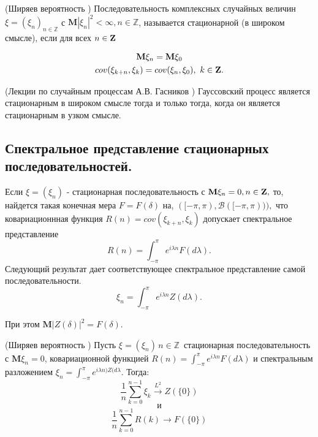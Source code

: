\begin{definition}(Ширяев вероятность \cite{ShiryaevVeroyatnost1})
Последовательность комплексных случайных величин $\xi = (\xi_n)_{n\in\mathbb{Z}}$ с $\mathbf{M}|\xi_n|^2 < \infty, n\in\mathbb{Z}$, называется стационарной (в широком смысле), если для всех $n \in \mathbb{\bf{Z}}$ 

\begin{equation}
\begin{gathered}
\mathbf{M}\xi_n = \mathbf{M}\xi_0 \\
cov(\xi_{k+n}, \xi_k) = cov(\xi_n, \xi_0), \  k\in\mathbb{\bf{Z}}.
\end{gathered}
\end{equation}

\end{definition}

\begin{theorem}(Лекции по случайным процессам А.В. Гасников \cite{GasnikovLectionsRP}) 
Гауссовский процесс является стационарным в широком смысле тогда и только тогда, когда он является стационарным в узком смысле.
\end{theorem}

\subsection{Спектральное представление стационарных последовательностей.}

Если $\xi = (\xi_n)$ - стационарная последовательность с $\mathbf{M}\xi_n = 0, n \in \mathbb{\bf{Z}},$ то, найдется такая конечная мера $F = F(\delta)$ на, $([-\pi, \pi), \mathscr{B}([-\pi, \pi))),$ что ковариационнная функция $R(n) = cov(\xi_{k+n}, \xi_k)$ допускает спектральное представление
\begin{equation}
R(n) = \int_{-\pi}^{\pi} e^{i\lambda n}F(d\lambda).
\end{equation}
Следующий результат дает соответствующее спектральное представление самой последовательности.
\begin{equation}\label{spkt}
\xi_n = \int_{-\pi}^{\pi} e^{i\lambda n}Z(d\lambda).
\end{equation}

При этом $\mathbf{M}|Z(\delta)|^2 = F(\delta)$.

\begin{theorem}\label{t1}(Ширяев вероятность \cite{ShiryaevVeroyatnost1})
Пусть $\xi = (\xi_n)\, n \in \mathbb{Z}\,$ стационарная последовательность с $\mathbf{M}\xi_n = 0$, ковариационной функцией $R(n) = \int_{-\pi}^{\pi}   e^{i\lambda n}F(d\lambda)$ и спектральным разложением $\xi_n = \int_{-\pi}^{\pi} e^{i\lambda n)Z(d\lambda}$. Тогда:
\begin{equation}\label{eq1}
\frac{1}{n}\sum_{k=0}^{n-1}\xi_k \xrightarrow{L^2}Z(\{ 0\})
\end{equation}
$$
\text{и}
$$
\begin{equation}\label{eq2}
\frac{1}{n}\sum_{k=0}^{n-1} R(k) \xrightarrow{}F(\{ 0\})
\end{equation}
\end{theorem}



